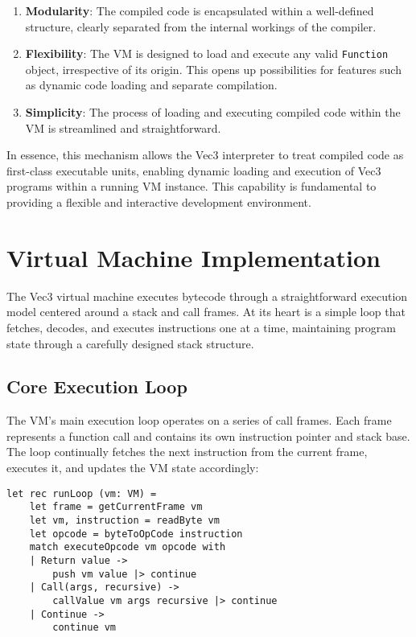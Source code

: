 \begin{enumerate}
    \item \textbf{Modularity}: The compiled code is encapsulated within a well-defined structure, clearly separated from the internal workings of the compiler.
    \item \textbf{Flexibility}: The VM is designed to load and execute any valid \texttt{Function} object, irrespective of its origin.
    This opens up possibilities for features such as dynamic code loading and separate compilation.
    \item \textbf{Simplicity}: The process of loading and executing compiled code within the VM is streamlined and straightforward.
\end{enumerate}
In essence, this mechanism allows the Vec3 interpreter to treat compiled code as first-class executable units, enabling dynamic loading and execution of Vec3 programs within a running VM instance.
This capability is fundamental to providing a flexible and interactive development environment.

\section{Virtual Machine Implementation}
\label{sec:virtual-machine}

The Vec3 virtual machine executes bytecode through a straightforward execution model centered around a stack and call frames. 
At its heart is a simple loop that fetches, decodes, and executes instructions one at a time, maintaining program state through a carefully designed stack structure.

\subsection{Core Execution Loop}\label{subsec:core-execution-loop}

The VM's main execution loop operates on a series of call frames.
Each frame represents a function call and contains its own instruction pointer and stack base.
The loop continually fetches the next instruction from the current frame, executes it, and updates the VM state accordingly:

\begin{verbatim}
let rec runLoop (vm: VM) =
    let frame = getCurrentFrame vm
    let vm, instruction = readByte vm
    let opcode = byteToOpCode instruction
    match executeOpcode vm opcode with
    | Return value -> 
        push vm value |> continue
    | Call(args, recursive) ->
        callValue vm args recursive |> continue
    | Continue -> 
        continue vm
\end{verbatim}

